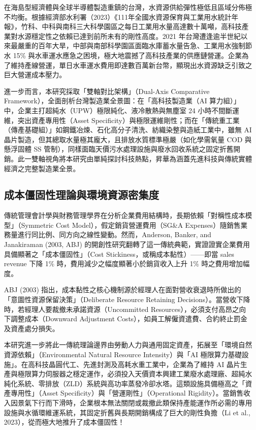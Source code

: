 \documentclass[12pt,a4paper]{article}
\begin{document}
在海島型經濟體與全球半導體製造重鎮的台灣，水資源供給彈性極低且區域分佈極不均衡。根據經濟部水利署（2023）《111年全國水資源保育與工業用水統計年報》，竹科、中科與南科三大科學園區之每日工業用水量高達數十萬噸，高科技產業對水源穩定性之依賴已達到前所未有的剛性高度。2021 年台灣遭逢逾半世紀以來最嚴重的百年大旱，中部與南部科學園區面臨水庫蓄水量告急、工業用水強制節水 15\% 與水車運水應急之困境，極大地震撼了高科技產業的供應鏈營運。企業為了維持產線營運，單日水車運水費用即達數百萬新台幣，顯現出水資源缺乏引致之巨大營運成本壓力。

進一步而言，本研究採取「雙軸對比架構」（Dual-Axis Comparative Framework），全面剖析台灣製造業全景圖：在「高科技製造業（AI 算力組）」中，企業主打超純水（UPW）極限純化、液冷散熱與無塵室 24 小時不間斷運維，突出資產專用性（Asset Specificity）與極限運維剛性；而在「傳統重工業（傳產基礎組）」如鋼鐵冶煉、石化高分子清洗、紡織染整與造紙工業中，雖無 AI 晶片製造，但其總取水量極其龐大，且排放水質標準極嚴（如化學需氧量 COD 與懸浮固體 SS 管制），同樣面臨天價污水處理設施與廢水回收系統之固定折舊開銷。此一雙軸視角將本研究由單純探討科技熱點，昇華為涵蓋先進科技與傳統實體經濟之完整製造業全景。

\subsection{成本僵固性理論與環境資源密集度}

傳統管理會計學與財務管理學界在分析企業費用結構時，長期依賴「對稱性成本模型」（Symmetric Cost Model），假定銷貨營運費用（SG\&A Expenses）隨銷售業務量進行同比例、同方向之線性變動。然而，Anderson, Banker, and Janakiraman (2003, ABJ) 的開創性研究翻轉了這一傳統典範，實證證實企業費用具備顯著之「成本僵固性」（Cost Stickiness，或稱成本黏性）——即當 sales revenue 下降 1\% 時，費用減少之幅度顯著小於銷貨收入上升 1\% 時之費用增加幅度。

ABJ (2003) 指出，成本黏性之核心機制源於經理人在面對營收衰退時所做出的「意圖性資源保留決策」（Deliberate Resource Retaining Decisions）。當營收下降時，若經理人要裁撤未承諾資源（Uncommitted Resources），必須支付高昂之向下調整成本（Downward Adjustment Costs），如員工解僱資遣費、合約終止罰金及資產處分損失。

本研究進一步將此一傳統理論邊界由勞動人力與通用固定資產，拓展至「環境自然資源依賴」（Environmental Natural Resource Intensity）與「AI 極限算力基礎設施」。在高科技晶圓代工、先進封測及高耗水重工業中，企業為了維持 AI 晶片生產與極限算力伺服器之穩定運作，必須投入天價資本興建工業廢水處理廠、超純水純化系統、零排放（ZLD）系統與高功率蒸發冷卻水塔。這類設施具備極高之「資產專用性」（Asset Specificity）與「營運剛性」（Operational Rigidity）。當銷售收入因景氣下行而下滑時，企業根本無法關閉或裁撤此類保持產能運作所必需的專用設施與水循環維運系統，其固定折舊與長期開銷構成了巨大的剛性負擔（Li et al., 2023），從而極大地推升了成本僵固性！
\end{document}
